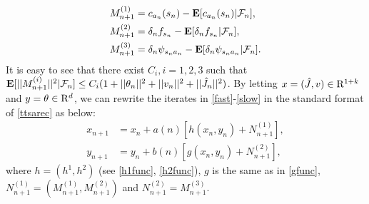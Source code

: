 \begin{align}
M^{(1)}_{n+1}&=c_{a_n}(s_n)-\mathbf{E}[c_{a_n}(s_n)|\mathcal{F}_n],\\
M^{(2)}_{n+1}&=\delta_nf_{s_n}-\mathbf{E}[\delta_nf_{s_n}|\mathcal{F}_n],\\
M^{(3)}_{n+1}&=\delta_n\psi_{s_na_n}-\mathbf{E}[\delta_n\psi_{s_na_n}|\mathcal{F}_n].
\end{align}
It is easy to see that there exist $C_i, i=1,2,3$ such that $\mathbf{E}[||M^{(i)}_{n+1}||^2|\mathcal{F}_n]\leq C_i(1+||\theta_n||^2+||v_n||^2+||\hat{J}_n||^2)$. By letting $x=(\hat{J},v) \in \mathrm{R}^{1+k}$ and $y=\theta\in \mathrm{R}^{d}$, we can rewrite the iterates in \eqref{fast}-\eqref{slow} in the standard format of \eqref{ttsarec} as below:
\begin{subequations}
\begin{align}
x_{n+1}&=x_n+a(n)[h(x_n,y_n)+N^{(1)}_{n+1}],\\
y_{n+1}&=y_n+b(n)[g(x_n,y_n)+N^{(2)}_{n+1}],
\end{align}
\end{subequations}
where $h=(h^1,h^2)$ (see \eqref{h1func}, \eqref{h2func}), $g$ is the same as in \eqref{gfunc}, $N^{(1)}_{n+1}=(M^{(1)}_{n+1},M^{(2)}_{n+1})$ and $N^{(2)}_{n+1}=M^{(3)}_{n+1}$.

